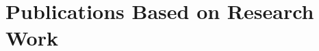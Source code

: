 \section*{Publications Based on Research Work}
\label{sec:publications}
    
    
    
    
    
    

